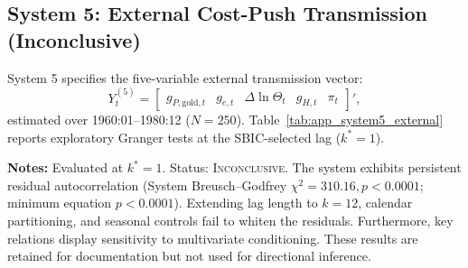 \subsection{System 5: External Cost-Push Transmission (Inconclusive)}
System 5 specifies the five-variable external transmission vector:
\begin{equation}
    Y^{(5)}_t = \begin{bmatrix} g_{P,\text{gold},t} & g_{e,t} & \Delta \ln \Theta_t & g_{H,t} & \pi_t \end{bmatrix}',
\end{equation}
estimated over 1960:01--1980:12 ($N=250$). Table~\ref{tab:app_system5_external} reports exploratory Granger tests at the SBIC-selected lag ($k^*=1$).

\begin{table}[htbp]
\centering
\small
\renewcommand{\arraystretch}{0.90}
\caption{Exploratory Granger Tests: External Cost-Push Transmission ($N=250$, Full Sample)}
\label{tab:app_system5_external}
\begin{minipage}{0.98\textwidth}
\vspace{0.3em}
\footnotesize \textbf{Notes:} Evaluated at $k^*=1$. Status: \textsc{Inconclusive}. The system exhibits persistent residual autocorrelation (System Breusch--Godfrey $\chi^2 = 310.16, p < 0.0001$; minimum equation $p < 0.0001$). Extending lag length to $k=12$, calendar partitioning, and seasonal controls fail to whiten the residuals. Furthermore, key relations display sensitivity to multivariate conditioning. These results are retained for documentation but not used for directional inference.
\end{minipage}
\end{table}

